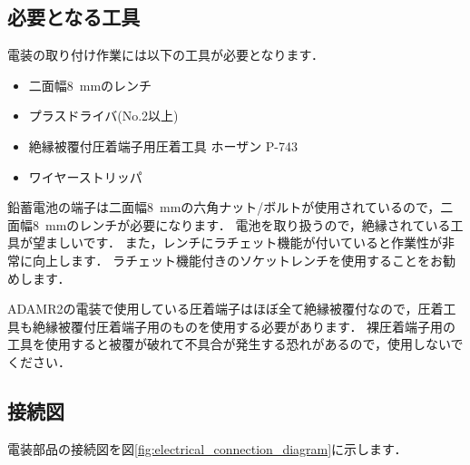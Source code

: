 \documentclass[{../../master}]{subfiles}
\begin{document}
  \subsection{必要となる工具}

  電装の取り付け作業には以下の工具が必要となります．

  \begin{itemize}
    \item 二面幅\SI{8}{mm}のレンチ
    \item プラスドライバ(No.2以上)
    \item 絶縁被覆付圧着端子用圧着工具 ホーザン P-743
    \item ワイヤーストリッパ
  \end{itemize}
  
  鉛蓄電池の端子は二面幅\SI{8}{mm}の六角ナット/ボルトが使用されているので，二面幅\SI{8}{mm}のレンチが必要になります．
  電池を取り扱うので，絶縁されている工具が望ましいです．
  また，レンチにラチェット機能が付いていると作業性が非常に向上します．
  ラチェット機能付きのソケットレンチを使用することをお勧めします．

  ADAMR2の電装で使用している圧着端子はほぼ全て絶縁被覆付なので，圧着工具も絶縁被覆付圧着端子用のものを使用する必要があります．
  裸圧着端子用の工具を使用すると被覆が破れて不具合が発生する恐れがあるので，使用しないでください．

  \subsection{接続図}

  電装部品の接続図を図\ref{fig:electrical_connection_diagram}に示します．
\end{document}
